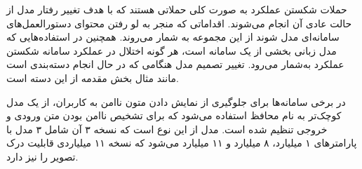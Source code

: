 
حملات شکستن عملکرد به صورت کلی حملاتی هستند که با هدف تغییر رفتار مدل از حالت عادی آن انجام می‌شوند. اقداماتی که منجر به لو رفتن محتوای دستورالعمل‌های سامانه‌ای مدل شوند از این مجموعه به شمار می‌روند. همچنین در استفاده‌هایی که مدل زبانی بخشی از یک سامانه است، هر گونه اختلال در عملکرد سامانه شکستن عملکرد به‌شمار می‌رود. تغییر تصمیم مدل هنگامی که در حال انجام دسته‌بندی است مانند مثال بخش مقدمه از این دسته است.


در برخی سامانه‌ها برای جلوگیری از نمایش دادن متون ناامن به کاربران، از یک مدل کوچک‌تر به نام محافظ استفاده می‌شود که برای تشخیص ناامن بودن متن ورودی و خروجی تنظیم شده است. مدل  از این نوع است که نسخه ۳ آن شامل ۳ مدل با پارامتر‌های ۱ میلیارد، ۸ میلیارد و ۱۱ میلیارد می‌شود که نسخه ۱۱ میلیاردی قابلیت درک تصویر را نیز دارد.
